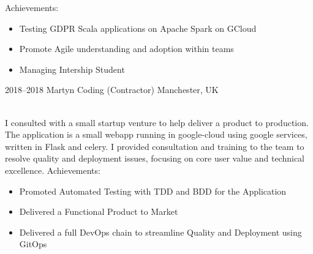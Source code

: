 \documentclass[]{cv-style}          %
\begin{document}
\begin{entrylist}
{  Achievements:
  \begin{itemize}
    \item Testing GDPR Scala applications on Apache Spark on GCloud
    \item Promote Agile understanding and adoption within teams
    \item Managing Intership Student
  \end{itemize}
}
\entry
{2018--2018}
{Martyn Coding (Contractor)}
{Manchester, UK}
{\\
I consulted with a small startup venture to help deliver a product to production.
The application is a small webapp running in google-cloud using google services, written in Flask and celery.
I provided consultation and training to the team to resolve quality and deployment issues, focusing on core user value and technical excellence.
Achievements:
\begin{itemize}
  \item Promoted Automated Testing with TDD and BDD for the Application
  \item Delivered a Functional Product to Market
  \item Delivered a full DevOps chain to streamline Quality and Deployment using GitOps
\end{itemize}
}
\end{entrylist}
\end{document}
